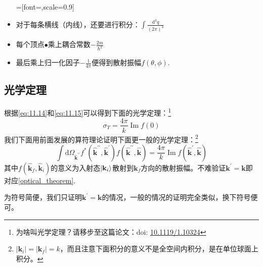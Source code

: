 \documentclass[a4paper,zihao=-4,linespread=1]{ctexrep}
\newcommand{\DOI}[1]{doi: \href{https://doi.org/#1}{#1}} %
\begin{document}
\begin{itemize}
		\begin{center}
			=[font=\large,scale=0.9]
		\end{center}
	
		\item 对于每条横线（内线），还要进行积分：$\int\frac{\mathrm{d}^3q}{(2\pi)^3}$
		\item 每个顶点$\bullet$乘上耦合常数$-\frac{2m}{\hbar^2}$
		\item 最后乘上归一化因子$-\frac{1}{4\pi}$便得到散射振幅$f(\theta,\phi)$.
	\end{itemize}
	\subsection{光学定理}
	根据\ref{eq:11.14}和\ref{eq:11.15}可以得到下面的光学定理：\footnote{为啥叫光学定理？请移步至这篇论文：\DOI{10.1119/1.10324}}
	\begin{equation}
		\label{optical_theorem}
		\boxed{
		\sigma_T=\frac{4\pi}{k}\operatorname{Im}f(0)
	}
	\end{equation}
	我们下面用前面发展的算符理论证明下面更一般的光学定理：\footnote{$|\mathbf{k}_i|=|\mathbf{k}_f|=k$，而且注意下面积分的意义不是全空间内积分，是在单位球面上积分。}
	\begin{equation}
		\boxed{
		\int \mathrm{d}\Omega_{\hat{\mathbf {k}}^{\prime\prime}}f^*(\hat{\mathbf{k}}^{\prime\prime},\hat{\mathbf{k}}^\prime)f(\hat{\mathbf{k}}^{\prime\prime},\hat{\mathbf{k}})=\frac{4\pi}{k}\operatorname{Im}f(\hat{\mathbf{k}}^\prime,\hat{\mathbf{k}})}
	\end{equation}
	其中$f(\hat{\mathbf{k}}_f,\hat{\mathbf{k}}_i)$的意义为入射态$\ket{\mathbf{k}_i}$散射到$\mathbf{k}_f$方向的散射振幅。不难验证$\mathbf{k}^\prime=\mathbf{k}$即对应\ref{optical_theorem}.
	
	为符号简便，我们只证明$\mathbf{k}^\prime=\mathbf{k}$的情况，一般的情况的证明完全类似，换下符号便可。
	
\end{document}
